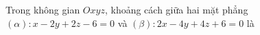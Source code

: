 \begin{ex}
Trong không gian $Oxyz$, khoảng cách giữa hai mặt phẳng $(\alpha)\colon x-2y+2z-6=0$ và $(\beta)\colon 2x-4y+4z+6=0$ là
\end{ex}
